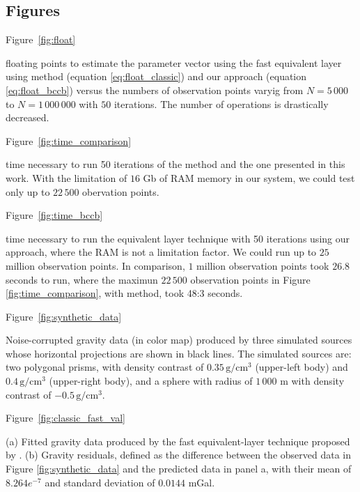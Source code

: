 \documentclass[manuscript,revised]{geophysics}
\renewcommand{\figdir}{figures} %
\begin{document}
\newpage



\subsection*{Figures}
\renewcommand{\figdir}{Fig} %

Figure~\ref{fig:float}

{floating points to estimate the parameter vector using the fast equivalent layer using \citet{siqueira-etal2017} method (equation \ref{eq:float_classic}) and our approach (equation \ref{eq:float_bccb}) versus the numbers of observation points varyig from $N = 5\,000$ to $N = 1\,000\,000$ with $50$ iterations. The number of operations is drastically decreased.}
\newpage

Figure~\ref{fig:time_comparison}

{time necessary to run 50 iterations of the \citet{siqueira-etal2017} method and the one presented in this work. With the limitation of $16$ Gb of RAM memory in our system, we could test only up to $22\,500$ obervation points.}

Figure~\ref{fig:time_bccb}

{time necessary to run the equivalent layer technique with 50 iterations using our approach, where the RAM is not a limitation factor. We could run up to $25$ million observation points. In comparison, $1$ million observation points took $26.8$ seconds to run, where the maximun $22\,500$ observation points in Figure \ref{fig:time_comparison}, with \citet{siqueira-etal2017} method, took 48:3 seconds.}
\newpage

Figure~\ref{fig:synthetic_data}

{Noise-corrupted gravity data (in color map) produced by three simulated sources  whose horizontal projections are shown in black lines. The simulated sources are: two polygonal prisms, with density contrast of $0.35\, \mathrm{g/cm^3}$ (upper-left body) and $0.4\, \mathrm{g/cm^3}$ (upper-right body), and a sphere with radius of $1\,000$ m with density contrast	of $-0.5\, \mathrm{g/cm^3}.$}
\newpage

Figure~\ref{fig:classic_fast_val}

{(a) Fitted gravity data produced by the fast equivalent-layer technique proposed by \citet{siqueira-etal2017}. (b) Gravity residuals, defined as the difference between the observed data in Figure \ref{fig:synthetic_data} and the predicted data in panel a, with their mean of $8.264e^{-7}$ and standard deviation of $0.0144$ mGal.}
\newpage
\end{document}
